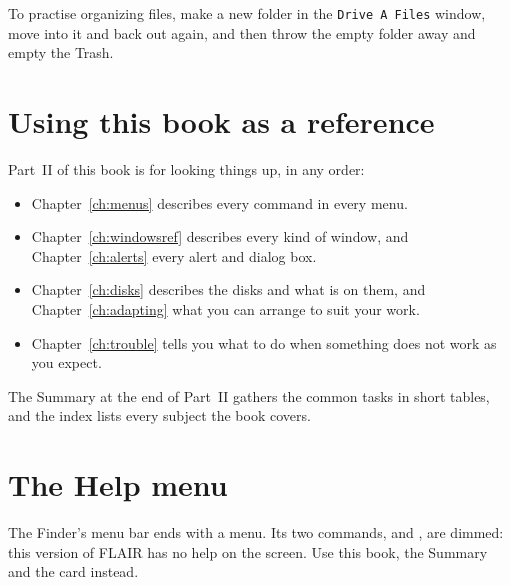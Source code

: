 To practise organizing files, make a new folder in the \texttt{Drive A
Files} window, move  into it and back out again, and then
throw the empty folder away and empty the Trash.

\section{Using this book as a reference}
Part~II of this book is for looking things up, in any order:
\begin{itemize}
\item Chapter~\ref{ch:menus} describes every command in every menu.
\item Chapter~\ref{ch:windowsref} describes every kind of window, and
  Chapter~\ref{ch:alerts} every alert and dialog box.
\item Chapter~\ref{ch:disks} describes the disks and what is on them, and
  Chapter~\ref{ch:adapting} what you can arrange to suit your work.
\item Chapter~\ref{ch:trouble} tells you what to do when something does
  not work as you expect.
\end{itemize}
The Summary at the end of Part~II gathers the common tasks in short tables,
and the index lists every subject the book covers.

\section{The Help menu}
The Finder's menu bar ends with a  menu.  Its two commands,
 and , are dimmed: this
version of FLAIR has no help on the screen.  Use this book, the Summary and
the  card instead.

